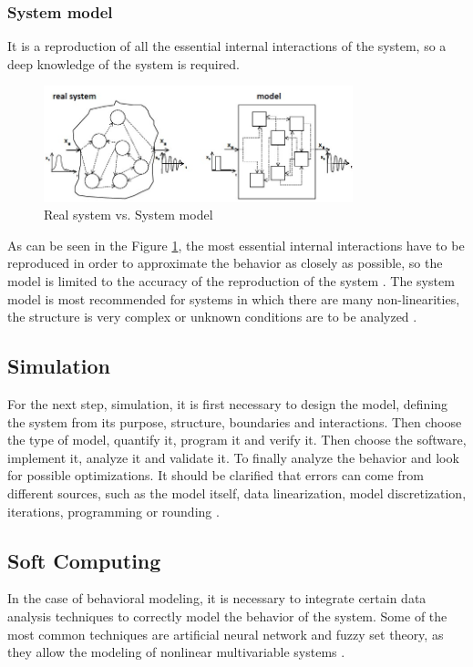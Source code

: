 \documentclass{article}
\begin{document}
\begin{doublespacing}
{\subsubsection{System model}
\par It is a reproduction of all the essential internal interactions of the system, so a deep knowledge of the system is required.

\begin{figure}[H] 
    \centering
    \includegraphics[width=0.8\textwidth]{Images/SystemModel.JPG} 
    \caption{Real system vs. System model \cite{kaestner:basics}} 
    \label{fig:SystemModel} 
\end{figure}

\par As can be seen in the Figure \ref{fig:SystemModel}, the most essential internal interactions have to be reproduced in order to approximate the behavior as closely as possible, so the model is limited to the accuracy of the reproduction of the system \cite{kaestner:basics}. The system model is most recommended for systems in which there are many non-linearities, the structure is very complex or unknown conditions are to be analyzed \cite{kaestner:basics}.
}

\subsection{Simulation} 
\par For the next step, simulation, it is first necessary to design the model, defining the system from its purpose, structure, boundaries and interactions. Then choose the type of model, quantify it, program it and verify it. Then choose the software, implement it, analyze it and validate it. To finally analyze the behavior and look for possible optimizations. It should be clarified that errors can come from different sources, such as the model itself, data linearization, model discretization, iterations, programming or rounding \cite{kaestner:basics}.

\subsection{Soft Computing}
\par In the case of behavioral modeling, it is necessary to integrate certain data analysis techniques to correctly model the behavior of the system. Some of the most common techniques are artificial neural network and fuzzy set theory, as they allow the modeling of nonlinear multivariable systems \cite{kaestner:SCANN}.  



\end{doublespacing}
\end{document}
